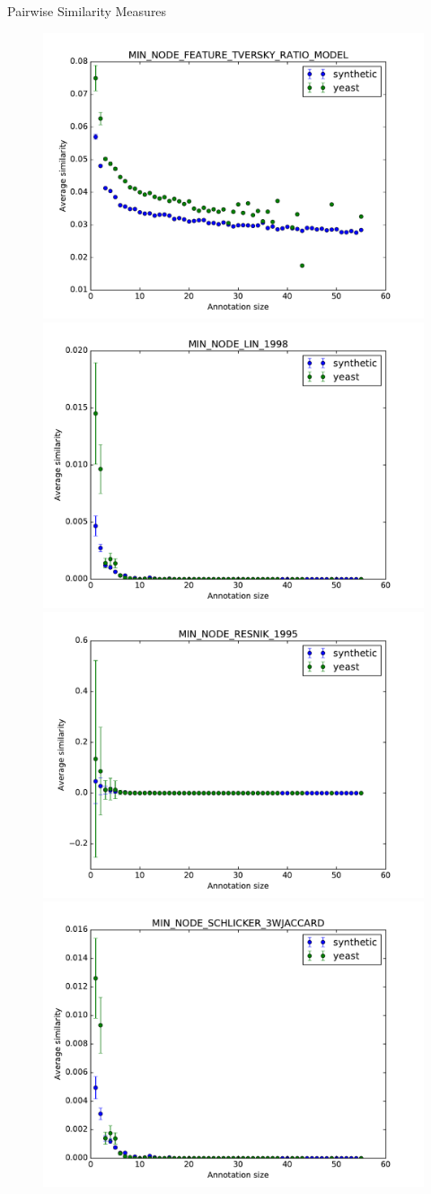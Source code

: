 \documentclass{beamer}
\begin{document}
\begin{frame}{Pairwise Similarity Measures}
\begin{figure}
\includegraphics[width=0.5\linewidth, height=0.4\textheight]{pairwise/SIM_GROUPWISE_MIN_SIM_PAIRWISE_DAG_NODE_FEATURE_TVERSKY_RATIO_MODEL_avg.pdf}
\includegraphics[width=0.5\linewidth, height=0.4\textheight]{pairwise/SIM_GROUPWISE_MIN_SIM_PAIRWISE_DAG_NODE_LIN_1998_avg.pdf} \\
\includegraphics[width=0.5\linewidth, height=0.4\textheight]{pairwise/SIM_GROUPWISE_MIN_SIM_PAIRWISE_DAG_NODE_RESNIK_1995_avg.pdf}
\includegraphics[width=0.5\linewidth, height=0.4\textheight]{pairwise/SIM_GROUPWISE_MIN_SIM_PAIRWISE_DAG_NODE_SCHLICKER_3WJACCARD_avg.pdf}
\end{figure}
\end{frame}
\end{document}
